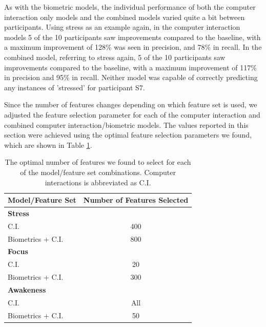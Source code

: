 As with the biometric models, the individual performance of both the computer interaction only models and the combined models varied quite a bit between participants. Using stress as an example again, in the computer interaction models 5 of the 10 participants saw improvements compared to the baseline, with a maximum improvement of 128\% was seen in precision, and 78\% in recall. In the combined model, referring to stress again, 5 of the 10 participants saw improvements compared to the baseline, with a maximum improvement of 117\% in precision and 95\% in recall. Neither model was capable of correctly predicting any instances of 'stressed' for participant S7.

Since the number of features changes  depending on which feature set is used, we adjusted the feature selection parameter for each of the computer interaction and combined computer interaction/biometric models. The values reported in this section were achieved using the optimal feature selection parameters we found, which are shown in Table \ref{ciFeatureSelection}.

\begin{table}
\begin{center}
\begin{tabular}{lc}
\hline
Model/Feature Set & Number of Features Selected\\
\hline
\textbf{Stress}\\
\hspace{3mm}C.I. & 400\\
\hspace{3mm}Biometrics + C.I. & 800\\
\hline
\textbf{Focus}\\
\hspace{3mm}C.I. & 20\\
\hspace{3mm}Biometrics + C.I. & 300\\
\hline
\textbf{Awakeness}\\
\hspace{3mm}C.I. & All\\
\hspace{3mm}Biometrics + C.I. & 50\\
\hline

\end{tabular}
\caption{The optimal number of features we found to select for each of the model/feature set combinations. Computer interactions is abbreviated as C.I.}
\label{ciFeatureSelection}
\end{center}
\end{table}



